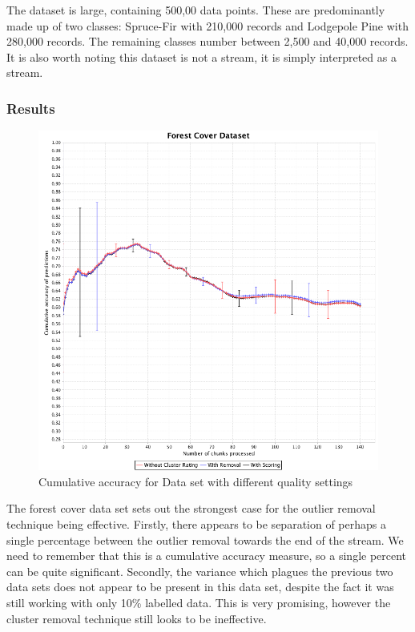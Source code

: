 \documentclass[12pt,a4paper,oneside]{report}
\begin{document}
The dataset is large, containing 500,00 data points. These are predominantly made up of two classes: Spruce-Fir with 210,000 records and Lodgepole Pine with 280,000 records. The remaining classes number between 2,500 and 40,000 records. It is also worth noting this dataset is not a stream, it is simply interpreted as a stream. 
\subsubsection*{Results}

\begin{figure}
	\includegraphics[scale=0.4]{covDataLine}
	\caption{Cumulative accuracy for Data set with different quality settings}
\end{figure}

The forest cover data set sets out the strongest case for the outlier removal technique being effective. Firstly, there appears to be separation of perhaps a single percentage between the outlier removal towards the end of the stream. We need to remember that this is a cumulative accuracy measure, so a single percent can be quite significant. Secondly, the variance which plagues the previous two data sets does not appear to be present in this data set, despite the fact it was still working with only 10\% labelled data. This is very promising, however the cluster removal technique still looks to be ineffective. 
\end{document}
